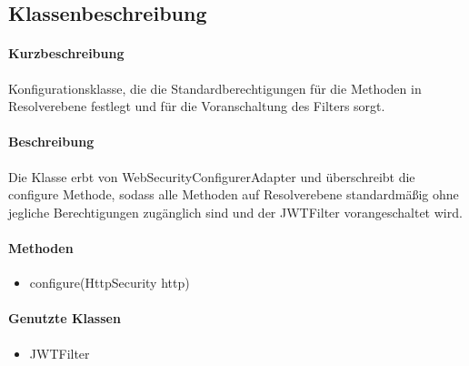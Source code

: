 \subsection*{Klassenbeschreibung}%
\paragraph*{Kurzbeschreibung}
Konfigurationsklasse, die die Standardberechtigungen für die Methoden in Resolverebene festlegt und für die Voranschaltung des Filters sorgt.
\paragraph*{Beschreibung}
Die Klasse erbt von \dq WebSecurityConfigurerAdapter\dq{} und überschreibt die \dq configure\dq{} Methode, sodass 
alle Methoden auf Resolverebene standardmäßig ohne jegliche Berechtigungen zugänglich sind und der JWTFilter vorangeschaltet wird.
\paragraph*{Methoden}
\begin{itemize}
	\item configure(HttpSecurity http)
\end{itemize}	
\paragraph*{Genutzte Klassen}
\begin{itemize}
	\item JWTFilter
\end{itemize}	
